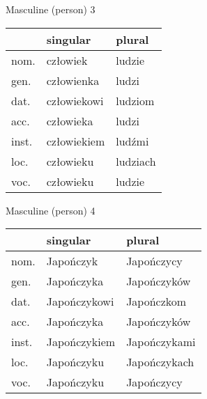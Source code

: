 \documentclass[10pt,twoside]{../filofax2}
\begin{document}
\begin{ffpage}{}
Masculine (person) 3
\begin{tabular}{|m{1cm}||m{2.5cm}|m{2.5cm}|}
	\hline
	&singular& plural\\ \hline
	nom. &człowiek&ludzie \\ \hline
	gen. &człowienka&ludzi\\ \hline
	dat. &człowiekowi&ludziom\\ \hline
	acc. &człowieka&ludzi\\ \hline
	inst.&człowiekiem&ludźmi\\ \hline
	loc. &człowieku&ludziach\\ \hline
	voc. &człowieku&ludzie\\ \hline
\end{tabular}

\vspace{0.75cm}
Masculine (person) 4
\begin{tabular}{|m{1cm}||m{2.5cm}|m{2.5cm}|}
	\hline
	&singular& plural\\ \hline
	nom. &Japończyk&Japończycy\\ \hline
	gen. &Japończyka&Japończyków\\ \hline
	dat. &Japończykowi&Japończkom\\ \hline
	acc. &Japończyka&Japończyków\\ \hline
	inst.&Japończykiem&Japończykami\\ \hline
	loc. &Japończyku&Japończykach\\ \hline
	voc. &Japończyku&Japończycy\\\hline
\end{tabular}
\end{ffpage}
\end{document}
